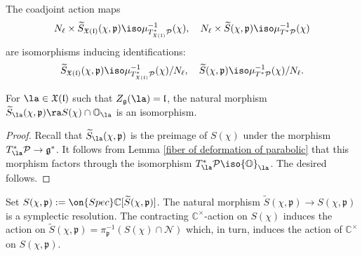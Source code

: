 \documentclass[12pt]{amsart}
\begin{document}
    
    \begin{prop}\label{prop_coadj_N_iso}
    The coadjoint action maps
    \begin{equation*}
    N_\ell \times \widetilde{S}_{\mathfrak{X}(\mathfrak{l})}(\chi,\mathfrak{p}) \iso \mu_{T^*_{\mathfrak{X}(\mathfrak{l})}\mathcal{P}}^{-1}(\chi), \quad N_\ell \times \widetilde{S}(\chi,\mathfrak{p}) \iso \mu^{-1}_{T^*\mathcal{P}}(\chi)
    \end{equation*}
    are isomorphisms inducing identifications:
    \begin{equation*}
    \widetilde{S}_{\mathfrak{X}(\mathfrak{l})}(\chi,\mathfrak{p}) \iso \mu_{T^*_{\mathfrak{X}(\mathfrak{l})}\mathcal{P}}^{-1}(\chi)/N_\ell, \quad \widetilde{S}(\chi,\mathfrak{p}) \iso \mu^{-1}_{T^*\mathcal{P}}(\chi)/N_\ell.
    \end{equation*}
    \end{prop}



\begin{lemma}\label{lem_fiber_parab_slod_gen}
For $\la \in \mathfrak{X}(\mathfrak{l})$ such that $Z_{\mathfrak{g}}(\la)=\mathfrak{l}$, the natural morphism $\widetilde{S}_{\la}(\chi,\mathfrak{p}) \ra S(\chi) \cap \mathbb{O}_{\la}$ is an isomorphism.
\end{lemma}
\begin{proof}
Recall that $\widetilde{S}_{\la}(\chi,\mathfrak{p})$ is the preimage of $S(\chi)$ under the morphism $T^*_\la\mathcal{P} \rightarrow \mathfrak{g}^*$. It follows from Lemma \ref{fiber of deformation of parabolic} that this morphism factors through the isomorphism $T^*_\la \mathcal{P} \iso {\mathbb{O}}_\la$. The desired follows.
\end{proof}



Set $S(\chi,\mathfrak{p}):=\on{Spec}\mathbb{C}[\widetilde{S}(\chi,\mathfrak{p})]$. The natural morphism $\widetilde{S}(\chi,\mathfrak{p}) \rightarrow S(\chi,\mathfrak{p})$ is a symplectic resolution. The contracting $\mathbb{C}^\times$-action on $S(\chi)$ induces the action on $\widetilde{S}(\chi,\mathfrak{p})=\pi_{\mathfrak{p}}^{-1}(S(\chi) \cap \mathcal{N})$ which, in turn, induces the action of $\mathbb{C}^\times$ on $S(\chi,\mathfrak{p})$.
\end{document}
